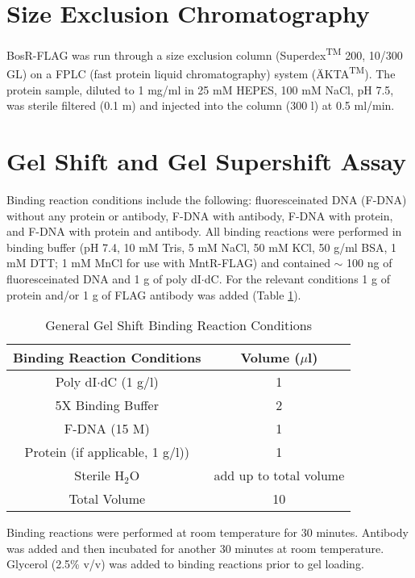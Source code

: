 \documentclass[12pt,twoside]{reedthesis}
\begin{document}
   \section{Size Exclusion Chromatography}
   
   BosR-FLAG was run through a size exclusion column (Superdex\textsuperscript{TM} 200, 10/300 GL) on a FPLC (fast protein liquid chromatography) system ({\"A}KTA\textsuperscript{TM}). The protein sample, diluted to 1 mg/ml in 25 mM HEPES, 100 mM NaCl, pH 7.5, was sterile filtered (0.1 \micro m) and injected into the column (300 \micro l) at 0.5 ml/min.

\section{Gel Shift and Gel Supershift Assay}

Binding reaction conditions include the following: fluoresceinated DNA (F-DNA) without any protein or antibody, F-DNA with antibody, F-DNA with protein, and F-DNA with protein and antibody. All binding reactions were performed in binding buffer (pH 7.4, 10 mM Tris, 5 mM NaCl, 50 mM KCl, 50 \micro g/ml BSA, 1 mM DTT; 1 mM MnCl for use with MntR-FLAG) and contained $\sim$ 100 ng of fluoresceinated DNA and 1 \micro g of poly dI$\cdot$dC. For the relevant conditions 1 \micro g of protein and/or 1 \micro g of FLAG antibody was added (Table \ref{shiftconditions}).


\begin{table}[H]
	\centering
	\caption[General Gel Shift Binding Reaction Conditions]{General Gel Shift Binding Reaction Conditions} 
	
	\label{shiftconditions}
	\begin{tabular}{|c|c|}
		\hline
		Binding Reaction Conditions & Volume ($\mu$l)  \\
		\hline 
		Poly dI$\cdot$dC (1 \micro g/\micro l) & 1   \\ 
		5X Binding Buffer & 2 \\  			
		F-DNA (15 \micro M) & 1   \\
		Protein (if applicable, 1 \micro g/\micro l)) & 1 \\  
		Sterile H$_{2}$O & add up to total volume   \\     
		\hline   
		Total Volume & 10  \\
		\hline
	\end{tabular}
\end{table}


Binding reactions were performed at room temperature for 30 minutes. Antibody was added and then incubated for another 30 minutes at room temperature. Glycerol (2.5\% v/v) was added to binding reactions prior to gel loading. 
\end{document}
